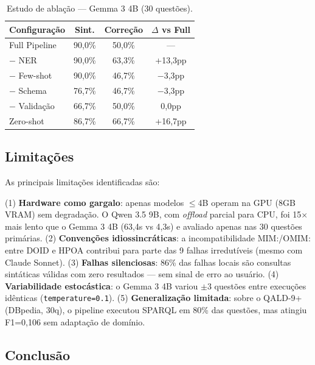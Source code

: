 \documentclass[12pt]{article}
\begin{document}
\begin{table}[H]
\centering
\caption{Estudo de abla\c{c}\~{a}o --- Gemma 3 4B (30 quest\~{o}es).}
\label{tab:ablacao}
\small
\begin{tabular}{lccc}
\toprule
\textbf{Configura\c{c}\~{a}o} & \textbf{Sint.} & \textbf{Corre\c{c}\~{a}o} & \textbf{$\Delta$ vs Full} \\
\midrule
Full Pipeline         & 90,0\% & 50,0\% & ---        \\
$-$ NER               & 90,0\% & 63,3\% & +13,3pp    \\
$-$ Few-shot          & 90,0\% & 46,7\% & $-$3,3pp   \\
$-$ Schema            & 76,7\% & 46,7\% & $-$3,3pp   \\
$-$ Valida\c{c}\~{a}o & 66,7\% & 50,0\% & 0,0pp      \\
Zero-shot             & 86,7\% & 66,7\% & +16,7pp    \\
\bottomrule
\end{tabular}
\end{table}

\subsection{Limita\c{c}\~{o}es}
\label{sec:limitacoes}

As principais limita\c{c}\~{o}es identificadas s\~{a}o:

(1) \textbf{Hardware como gargalo}: apenas modelos $\leq$4B operam na GPU (8GB VRAM) sem degrada\c{c}\~{a}o. O Qwen 3.5 9B, com \textit{offload} parcial para CPU, foi 15$\times$ mais lento que o Gemma 3 4B (63,4s vs 4,3s) e avaliado apenas nas 30 quest\~{o}es prim\'{a}rias.
(2) \textbf{Conven\c{c}\~{o}es idiossincr\'{a}ticas}: a incompatibilidade MIM:/OMIM: entre DOID e HPOA contribui para parte das 9 falhas irredut\'{i}veis (mesmo com Claude Sonnet).
(3) \textbf{Falhas silenciosas}: 86\% das falhas locais s\~{a}o consultas sint\'{a}ticas v\'{a}lidas com zero resultados --- sem sinal de erro ao usu\'{a}rio.
(4) \textbf{Variabilidade estoc\'{a}stica}: o Gemma 3 4B variou $\pm$3 quest\~{o}es entre execu\c{c}\~{o}es id\^{e}nticas (\texttt{temperature=0.1}).
(5) \textbf{Generaliza\c{c}\~{a}o limitada}: sobre o QALD-9+ \cite{qaldnineplus} (DBpedia, 30q), o pipeline executou SPARQL em 80\% das quest\~{o}es, mas atingiu F1=0,106 sem adapta\c{c}\~{a}o de dom\'{i}nio.

\subsection{Conclus\~{a}o}
\label{sec:conclusao}
\end{document}
